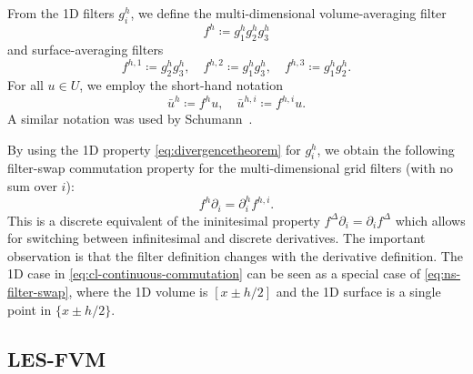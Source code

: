 \documentclass[preprint,twocolumn,5p]{elsarticle}
\begin{document}
From the 1D filters $g^h_i$, we define the multi-dimensional 
volume-averaging filter
\begin{equation} \label{eq:ns-fh}
f^h \coloneq g^h_1 g^h_2 g^h_3
\end{equation}
and surface-averaging filters
\begin{equation} \label{eq:ns-fhi}
    f^{h, 1} \coloneq g^h_2 g^h_3, \quad
    f^{h, 2} \coloneq g^h_1 g^h_3, \quad
    f^{h, 3} \coloneq g^h_1 g^h_2.
\end{equation}
For all $u \in U$, we employ the short-hand notation
\begin{equation}
    \bar{u}^{h} \coloneq f^h u, \quad
    \bar{u}^{h, i} \coloneq f^{h, i} u.
\end{equation}
A similar notation was used by Schumann~\cite{schumannSubgridScaleModel1975}.

By using the 1D property \eqref{eq:divergencetheorem} for $g^h_i$,
we obtain the following filter-swap commutation property for the
multi-dimensional grid filters
(with no sum over $i$):
\begin{equation} \label{eq:ns-filter-swap}
    f^h \partial_i = \partial^h_i f^{h, i}.
\end{equation}
This is a discrete equivalent of the ininitesimal property
$f^\Delta \partial_i = \partial_i f^\Delta$
which allows for switching between infinitesimal and
discrete derivatives. The important observation is that the filter definition
changes with the derivative definition.
The 1D case in \cref{eq:cl-continuous-commutation} can be seen as a special
case of \cref{eq:ns-filter-swap}, where the 1D volume is $[x \pm h / 2]$ and
the 1D surface is a single point in $\{ x \pm h / 2 \}$.


\subsection{LES-FVM}
\end{document}
